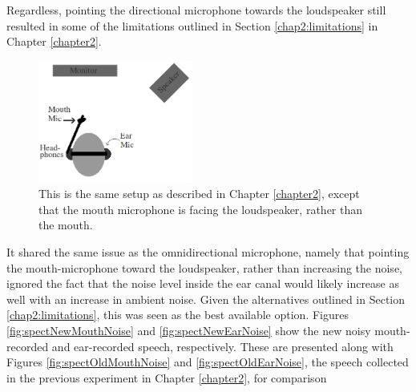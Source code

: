 Regardless, pointing the directional microphone towards the loudspeaker still resulted in some of the limitations outlined in Section \ref{chap2:limitations} in Chapter \ref{chapter2}.  
%
\begin{figure}
\centering
  \includegraphics[width=0.45\textwidth]{figure/overallSetUp_new.png}
  \caption{This is the same setup as described in Chapter \ref{chapter2}, except that the mouth microphone is facing the loudspeaker, rather than the mouth.}
  \label{fig:overallSetUp_new}
\end{figure}
%
It shared the same issue as the omnidirectional microphone, namely that pointing the mouth-microphone toward the loudspeaker, rather than increasing the noise, ignored the fact that the noise level inside the ear canal would likely increase as well with an increase in ambient noise.  Given the alternatives outlined in Section \ref{chap2:limitations}, this was seen as the best available option.  Figures \ref{fig:spectNewMouthNoise} and \ref{fig:spectNewEarNoise} show the new noisy mouth-recorded and ear-recorded speech, respectively.  These are presented along with Figures \ref{fig:spectOldMouthNoise} and \ref{fig:spectOldEarNoise}, the speech collected in the previous experiment in Chapter \ref{chapter2}, for comparison

